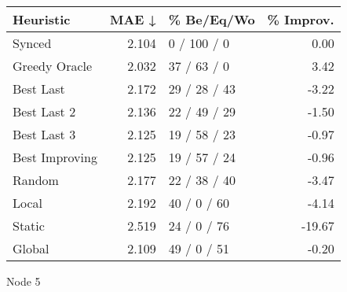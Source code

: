 \begin{tabular}{lrlr}
\toprule
\textbf{Heuristic} & \textbf{MAE ↓} & \textbf{\% Be/Eq/Wo} & \textbf{\% Improv.} \\
\midrule
            Synced &          2.104 &          0 / 100 / 0 &                0.00 \\
     Greedy Oracle &          2.032 &          37 / 63 / 0 &                3.42 \\
         Best Last &          2.172 &         29 / 28 / 43 &               -3.22 \\
       Best Last 2 &          2.136 &         22 / 49 / 29 &               -1.50 \\
       Best Last 3 &          2.125 &         19 / 58 / 23 &               -0.97 \\
    Best Improving &          2.125 &         19 / 57 / 24 &               -0.96 \\
            Random &          2.177 &         22 / 38 / 40 &               -3.47 \\
             Local &          2.192 &          40 / 0 / 60 &               -4.14 \\
            Static &          2.519 &          24 / 0 / 76 &              -19.67 \\
            Global &          2.109 &          49 / 0 / 51 &               -0.20 \\
\bottomrule
\end{tabular}
\caption{Node 5}
\label{tab:hr_non_lr05_le1_bs2_5}
